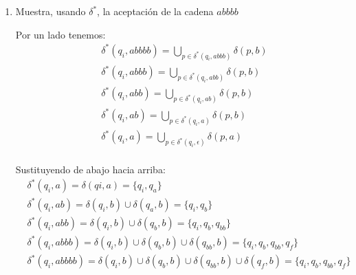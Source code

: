 \documentclass{article}
\begin{document}
\begin{enumerate}
\begin{enumerate}
\begin{center}
        \end{center}
        
        \item Muestra, usando $\delta^*$, la aceptación de la cadena $abbbb$

        Por un lado tenemos:
        \begin{align*}
        &\delta^*(q_i, abbbb) = \bigcup_{p \in \delta^*(q_i, abbb)} \delta(p,b) \\
        &\delta^*(q_i, abbb) = \bigcup_{p \in \delta^*(q_i, abb)} \delta(p,b)\\
        &\delta^*(q_i, abb) = \bigcup_{p \in \delta^*(q_i, ab)} \delta(p,b)\\
        &\delta^*(q_i, ab) = \bigcup_{p \in \delta^*(q_i, a)} \delta(p,b)\\
        &\delta^*(q_i, a) = \bigcup_{p \in \delta^*(q_i, \epsilon)} \delta(p,a)\\
        \end{align*}

        Sustituyendo de abajo hacia arriba:
        \begin{align*}
        &\delta^*(q_i, a) = \delta(qi,a) = \{q_i, q_a\}\\
        &\delta^*(q_i, ab) = \delta(q_i, b) \cup \delta(q_a,b) = \{q_i, q_b\}\\
        &\delta^*(q_i, abb) = \delta(q_i, b) \cup \delta(q_b,b) = \{q_i, q_b, q_{bb}\}\\
        &\delta^*(q_i, abbb) = \delta(q_i, b) \cup \delta(q_b, b) \cup \delta(q_{bb},b) = \{q_i, q_b, q_{bb},q_f\}\\
        &\delta^*(q_i, abbbb) = \delta(q_i,b) \cup \delta(q_b, b) \cup \delta(q_{bb},b) \cup \delta(q_f,b) = \{q_i, q_b, q_{bb}, q_f\}\\
        \end{align*}


\end{enumerate}
\end{enumerate}
\end{document}
